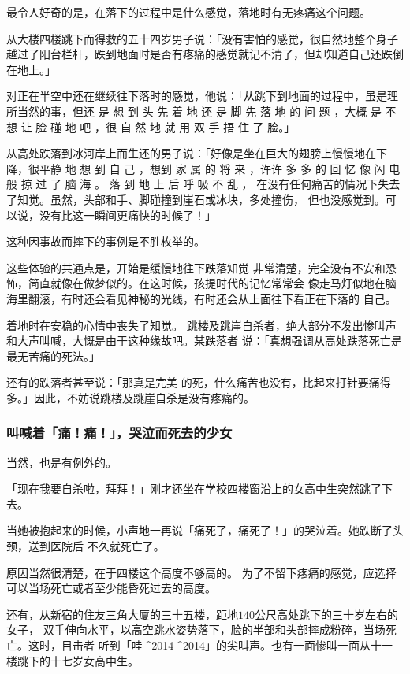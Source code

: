 \documentclass[UTF8]{ctexart}
\begin{document}
最令人好奇的是，在落下的过程中是什么感觉，落地时有无疼痛这个问题。

从大楼四楼跳下而得救的五十四岁男子说：「没有害怕的感觉，很自然地整个身子越过了阳台栏杆，跌到地面时是否有疼痛的感觉就记不清了，但却知道自己还跌倒在地上。」

对正在半空中还在继续往下落时的感觉，他说：「从跳下到地面的过程中，虽是理所当然的事，但还 是 想 到 头 先 着 地 还 是 脚 先 落 地 的 问 题 ，大概 是 不 想 让 脸 碰 地 吧 ，很 自 然 地 就 用 双 手 捂 住 了 脸。」

从高处跌落到冰河岸上而生还的男子说：「好像是坐在巨大的翅膀上慢慢地在下降，很平静 地 想 到 自 己 ，想到 家 属 的 将 来 ，许许 多 多 的 回 忆 像 闪 电 般 掠 过 了 脑 海 。
落 到 地 上 后 呼 吸 不 乱 ， 在没有任何痛苦的情况下失去了知觉。虽然，头部和手、脚碰撞到崖石或冰块，多处撞伤， 但也没感觉到。可以说，没有比这一瞬间更痛快的时候了！」

 这种因事故而摔下的事例是不胜枚举的。

这些体验的共通点是，开始是缓慢地往下跌落知觉 非常清楚，完全没有不安和恐怖，简直就像在做梦似的。在这时候，孩提时代的记忆常常会 像走马灯似地在脑海里翻滚，有时还会看见神秘的光线，有时还会从上面往下看正在下落的 自己。

着地时在安稳的心情中丧失了知觉。 
跳楼及跳崖自杀者，绝大部分不发出惨叫声和大声叫喊，大慨是由于这种缘故吧。某跌落者 说：「真想强调从高处跌落死亡是最无苦痛的死法。」

还有的跌落者甚至说：「那真是完美 的死，什么痛苦也没有，比起来打针要痛得多。」因此，不妨说跳楼及跳崖自杀是没有疼痛的。 

\subsubsection*{叫喊着「痛！痛！」，哭泣而死去的少女}

当然，也是有例外的。

「现在我要自杀啦，拜拜！」刚才还坐在学校四楼窗沿上的女高中生突然跳了下去。

当她被抱起来的时候，小声地一再说「痛死了，痛死了！」的哭泣着。她跌断了头颈，送到医院后
不久就死亡了。

原因当然很清楚，在于四楼这个高度不够高的。
为了不留下疼痛的感觉，应选择可以当场死亡或者至少能昏死过去的高度。

还有，从新宿的住友三角大厦的三十五楼，距地$140$公尺高处跳下的三十岁左右的女子， 双手伸向水平，以高空跳水姿势落下，脸的半部和头部摔成粉碎，当场死亡。这时，目击者 听到「哇^^^^2014^^^^2014」的尖叫声。也有一面惨叫一面从十一楼跳下的十七岁女高中生。
\end{document}
